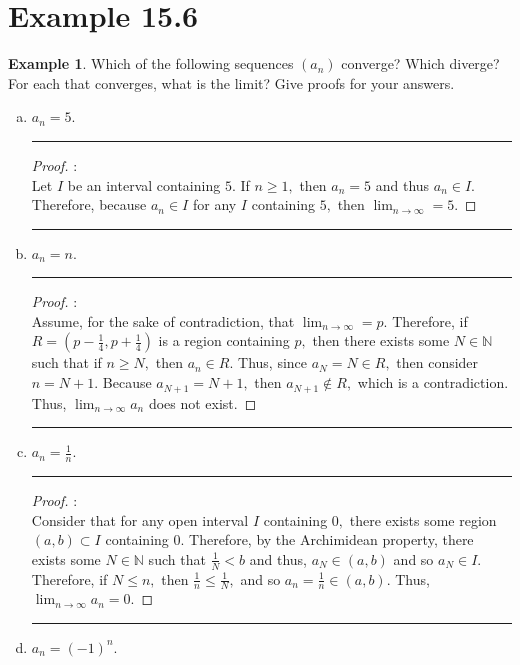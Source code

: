 \documentclass[openany, amssymb, psamsfonts]{amsart}
\newcommand{\bbN}{\mathbb{N}}
\theoremstyle{definition}
\newtheorem{exmp}{Example}[section]
\numberwithin{equation}{section}
\begin{document}
\section*{Example 15.6}
\begin{exmp} 
	\label{15.6}
	Which of the following sequences $(a_n)$ converge?  Which diverge? For each that converges, what is the limit? Give proofs for your answers.
		\begin{enumerate}[(a)]
			\item $a_n = 5$.
   \vspace{4pt}     \hrule   \vspace{4pt} \begin{proof}:\\
   Let $I$ be an interval containing $5.$ If $n \geq 1,$ then $a_n = 5$ and thus $a_n \in I.$ Therefore, because $a_n \in I$ for any $I$ containing $5,$ then $\displaystyle\lim_{n \to \infty} = 5.$
   \end{proof}\vspace{4pt}     \hrule   \vspace{4pt}
			\item $a_n = n$.
   \vspace{4pt}     \hrule   \vspace{4pt} \begin{proof}:\\
   Assume, for the sake of contradiction, that $\displaystyle\lim_{n \to \infty} = p.$ Therefore, if $R = (p-\frac{1}{4}, p + \frac{1}{4})$ is a region containing $p,$ then there exists some $N\in \bbN$ such that if $n\geq N,$ then $a_n \in R.$ Thus, since $a_{N} =N \in R,$ then consider $n = N+1.$ Because $a_{N+1} = N+1,$ then $a_{N+1}\notin R,$ which is a contradiction. Thus, $\displaystyle\lim_{n\to \infty}a_n$ does not exist. 
   \end{proof}\vspace{4pt}     \hrule   \vspace{4pt}
			\item $a_n = \frac{1}{n}$.
    \vspace{4pt}     \hrule   \vspace{4pt} \begin{proof}:\\
    Consider that for any open interval $I$ containing $0,$ there exists some region $(a,b)\subset I$ containing $0.$ Therefore, by the Archimidean property, there exists some $N\in \bbN$ such that $\frac{1}{N}< b$ and thus, $a_N \in (a,b)$ and so $a_N \in I.$ Therefore, if $N\leq n,$ then $\frac{1}{n} \leq \frac{1}{N},$ and so $a_n = \frac{1}{n} \in (a,b).$ Thus, $\displaystyle\lim_{n \to \infty}a_n = 0.$
    \end{proof}\vspace{4pt}     \hrule   \vspace{4pt}
			\item $a_n = (-1)^n$.
		\end{enumerate}
\end{exmp}
\end{document}
